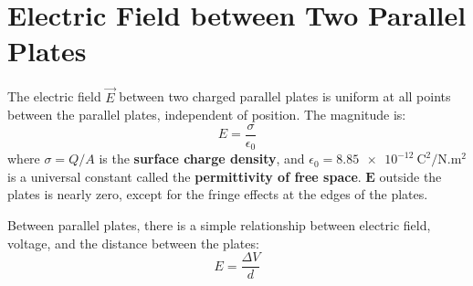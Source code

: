\section{Electric Field between Two Parallel Plates}

\begin{center}
\end{center}
The electric field $\vec E$ between two charged parallel plates is uniform at
all points between the parallel plates, independent of position. The magnitude
is:
\begin{equation}
  \boxed{
    E=\frac\sigma{\epsilon_0}
  }
\end{equation}
where $\sigma=Q/A$ is the \textbf{surface charge density}, and
$\epsilon_0=\SI{8.85e-12}{\coulomb\squared\per\newton.\metre\squared}$ is a
universal constant called the \textbf{permittivity of free space}. $\mathbf E$
outside the plates is nearly zero, except for the fringe effects at the edges
of the plates.

Between parallel plates, there is a simple relationship between electric
field, voltage, and the distance between the plates:
\begin{equation}
  \boxed{
    E=\frac{\Delta V}d
  }
\end{equation}





